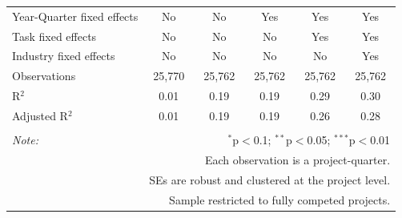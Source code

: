 \documentclass[
]{article}
\begin{document}
\begin{table}[H]
\begin{tabular}{@{\extracolsep{-2pt}}lccccc}
Year-Quarter fixed effects & No & No & Yes & Yes & Yes \\ 
Task fixed effects & No & No & No & Yes & Yes \\ 
Industry fixed effects & No & No & No & No & Yes \\ 
Observations & 25,770 & 25,762 & 25,762 & 25,762 & 25,762 \\ 
R$^{2}$ & 0.01 & 0.19 & 0.19 & 0.29 & 0.30 \\ 
Adjusted R$^{2}$ & 0.01 & 0.19 & 0.19 & 0.26 & 0.28 \\ 
\hline 
\hline \\[-1.8ex] 
\textit{Note:}  & \multicolumn{5}{r}{$^{*}$p$<$0.1; $^{**}$p$<$0.05; $^{***}$p$<$0.01} \\ 
 & \multicolumn{5}{r}{Each observation is a project-quarter.} \\ 
 & \multicolumn{5}{r}{SEs are robust and clustered at the project level.} \\ 
 & \multicolumn{5}{r}{Sample restricted to fully competed projects.} \\ 
\end{tabular} 
\end{table}
\end{document}
